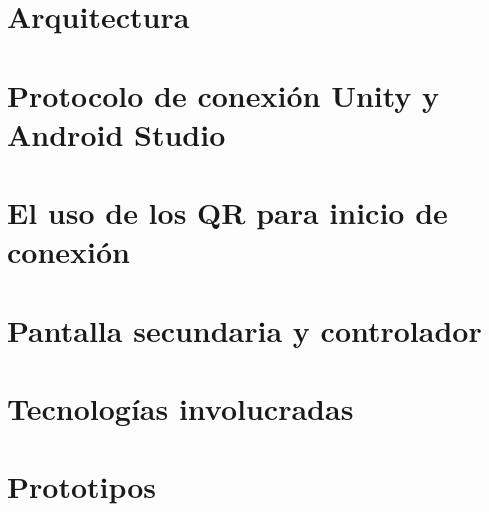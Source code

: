 \section{Arquitectura}
\label{cap4:sec:arquitectura}



\section{Protocolo de conexi\'on Unity y Android Studio}
\label{cap4:sec:protocolo}


\section{El uso de los QR para inicio de conexi\'on}
\label{cap4:QR}


\section{Pantalla secundaria y controlador}
\label{cap4:pantallasecundaria}


\section{Tecnolog\'ias involucradas}
\label{cap4:tecnologiasinvolucradas}


\section{Prototipos}
\label{cap4:prototipos}




